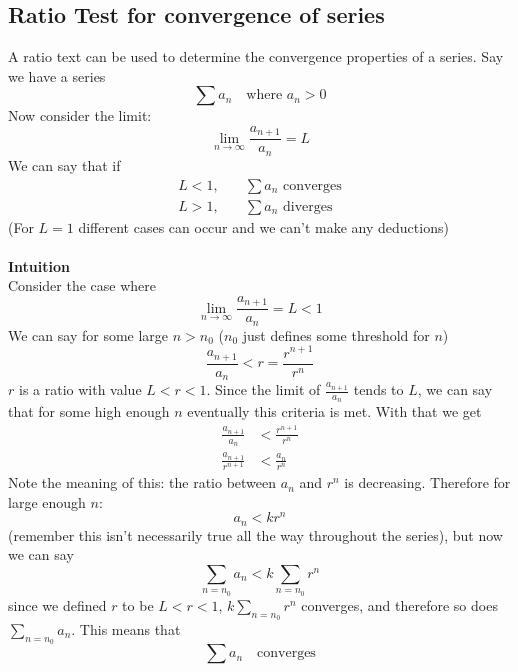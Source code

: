 \documentclass{report}
\begin{document}
\subsection{Ratio Test for convergence of series} %
A ratio text can be used to determine the convergence properties of a series. Say we have
a series
\begin{equation*}
\sum a_n\quad\text{where $a_n>0$}
\end{equation*}
Now consider the limit:
\begin{equation*}
\lim_{n\to\infty}\frac{a_{n+1}}{a_n}=L
\end{equation*}
We can say that if
\begin{align*}
L<1,&\quad\sum a_n\text{ converges}\\
L>1,&\quad\sum a_n\text{ diverges}
\end{align*}
(For $L=1$ different cases can occur and we can't make any deductions)\\
\vspace{1mm}\\
\textbf{Intuition}\\
Consider the case where
\begin{equation*}
\lim_{n\to\infty}\frac{a_{n+1}}{a_n}=L<1
\end{equation*}
We can say for some large $n>n_0$ ($n_0$ just defines some threshold for $n$)
\begin{equation*}
\frac{a_{n+1}}{a_n}<r=\frac{r^{n+1}}{r^n}
\end{equation*}
$r$ is a ratio with value $L<r<1$. Since the limit of $\frac{a_{n+1}}{a_n}$ tends to $L$, we can say that for some high enough $n$ 
eventually this criteria is met. With that we get
\begin{align*}
\frac{a_{n+1}}{a_n}&<\frac{r^{n+1}}{r^n}\\
\frac{a_{n+1}}{r^{n+1}}&<\frac{a_n}{r^n}
\end{align*}
Note the meaning of this: the ratio between $a_n$ and $r^n$ is decreasing.
Therefore for large enough $n$:
\begin{equation*}
a_n<kr^n
\end{equation*}
(remember this isn't necessarily true all the way throughout the series), but now we can say
\begin{equation*}
\sum_{n=n_0}a_n<k\sum_{n=n_0}r^n
\end{equation*}
since we defined $r$ to be $L<r<1$, $k\sum_{n=n_0}r^n$ converges, and therefore so does
$\sum_{n=n_0}a_n$. This means that 
\begin{equation*}
\sum a_n\quad\text{converges}
\end{equation*}
\end{document}

